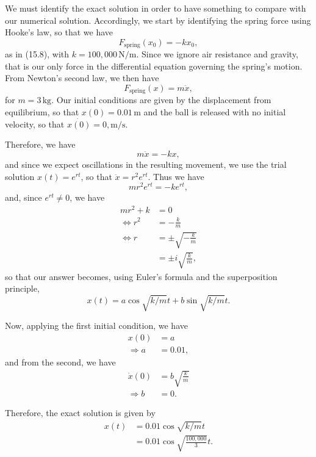 We must identify the exact solution in order to have something to compare
with our numerical solution. Accordingly, we start by identifying the spring 
force using Hooke's law, so that we have
\[
    F_{\text{spring}}(x_0) = -kx_0,
\]
as in (15.8), with $k = 100,000\,\text{N/m}$. Since we ignore air resistance
and gravity, that is our only force in the differential equation governing
the spring's motion. From Newton's second law, we then have
\[
    F_{\text{spring}}(x) = m\ddot{x},
\]
for $m = 3\,\text{kg}$. Our initial conditions are given by the displacement
from equilibrium, so that $x(0) = 0.01\,\text{m}$ and the ball is released
with no initial velocity, so that $\dot{x(0)} = 0,\text{m/s}$.

Therefore, we have
\[
    m\ddot{x} = -kx,
\]
and since we expect oscillations in the resulting movement, we use the trial
solution $x(t) = e^{rt}$, so that $\ddot{x} = r^2e^{rt}$. Thus we have
\[
    mr^2e^{rt} = -ke^{rt},
\]
and, since $e^{rt} \neq 0$, we have
\begin{equation*}
    \begin{split}
        mr^2 + k &= 0 \\
        \Leftrightarrow r^2 &= -\frac{k}{m} \\
        \Leftrightarrow r &= \pm \sqrt{-\frac{k}{m}} \\
                          &= \pm i \sqrt{\frac{k}{m}},
    \end{split}
\end{equation*}
so that our answer becomes, using Euler's formula and the superposition 
principle,
\[
    x(t) = a\cos{\sqrt{k/m}t} + b\sin{\sqrt{k/m}t}.
\]

Now, applying the first initial condition, we have
\begin{equation*}
    \begin{split}
        x(0) &= a \\
        \Rightarrow a &= 0.01,
    \end{split}
\end{equation*}
and from the second, we have
\begin{equation*}
    \begin{split}
        \dot{x}(0) &= b\sqrt{\frac{k}{m}} \\
        \Rightarrow b &= 0.
    \end{split}
\end{equation*}

Therefore, the exact solution is given by
\begin{equation*}
    \begin{split}
        x(t) &= 0.01\cos{\sqrt{k/m}t} \\
             &= 0.01\cos{\sqrt{\frac{100,000}{3}}t}.
    \end{split}
\end{equation*}

